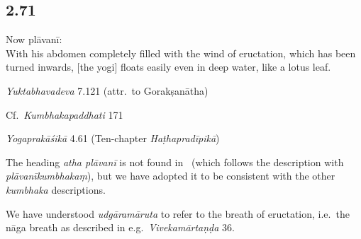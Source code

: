 \begin{ekdosis}
\subsection*{2.71}
\begin{translation}[hp02_071]
Now plāvanī:\\
With his abdomen completely filled with the wind of eructation, which has been turned inwards, [the yogi] floats easily even in deep water, like a lotus leaf.
\end{translation}

\begin{testimonia}[hp02_071]

\emph{Yuktabhavadeva} 7.121 (attr.~to Gorakṣanātha)

\begin{versinnote}
\end{versinnote}

Cf.~\emph{Kumbhakapaddhati} 171

\begin{versinnote}
\end{versinnote}

\emph{Yogaprakāśikā} 4.61 (Ten-chapter \emph{Haṭhapradīpikā})

\begin{versinnote}
\end{versinnote}
\end{testimonia}

\begin{philcomm}[hp02_071]
The heading \emph{atha plāvanī} is not found in \alphaOne \ (which follows the description with \emph{plāvanīkumbhakaṃ}), but we have adopted it to be consistent with the other \emph{kumbhaka} descriptions.

We have understood \emph{udgāramāruta} to refer to the breath of eructation, i.e.~the nāga breath as described in e.g.~\emph{Vivekamārtaṇḍa} 36.


\end{philcomm}
\end{ekdosis}
